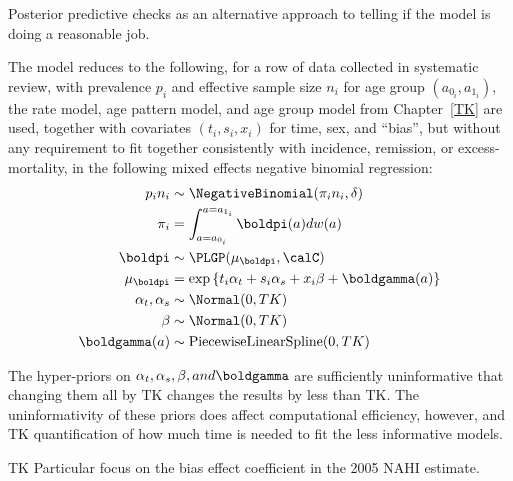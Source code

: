 Posterior predictive checks as an alternative approach to telling if
the model is doing a reasonable job.

The model reduces to the following, for a row of data collected in
systematic review, with prevalence $p_i$ and effective sample size $n_i$ for
age group $(a_{0_i}, a_{1_i})$, the rate model, age pattern model,
and age group model from Chapter~\ref{TK} are used, together with
covariates $(t_i,s_i,x_i)$ for time, sex, and ``bias'', but without any requirement to
fit together consistently with incidence, remission, or
excess-mortality, in the following mixed effects negative binomial
regression:
\begin{align*}
p_i n_i &\sim \NegativeBinomial(\pi_i n_i, \delta)\\
\pi_i &= \int _{a=a_{0_i}} ^{a=a_{1_i}} \boldpi(a) dw(a)\\
\boldpi &\sim \PLGP(\mu_\boldpi, \calC)\\
\mu_\boldpi &= \exp\left\{ t_i \alpha_t + s_i \alpha_s + x_i \beta + \boldgamma(a) \right\}\\
\alpha_t, \alpha_s &\sim \Normal(0, TK)\\
\beta &\sim \Normal(0, TK)\\
\boldgamma(a) &\sim \text{PiecewiseLinearSpline}(0, TK)
\end{align*}

The hyper-priors on $\alpha_t, \alpha_s, \beta, and \boldgamma$ are
sufficiently uninformative that changing them all by TK changes the
results by less than TK.  The uninformativity of these priors does
affect computational efficiency, however, and TK quantification of how
much time is needed to fit the less informative models.

TK Particular focus on the bias effect coefficient in the 2005 NAHI estimate.
